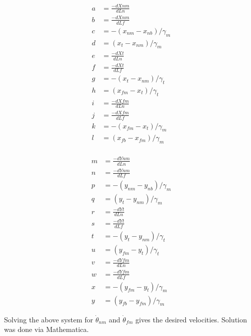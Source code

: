 \documentclass[
11pt, %
english, %
singlespacing, %
headsepline, %
chapterinoneline, %
]{MastersDoctoralThesis} %
\begin{document}
\begin{center}
  \begin{minipage}{0.3\textwidth}
    \begin{align*}
      a &= \frac{-dXnm}{dLn}\\
       b &= \frac{-dXnm}{dLf}\\
       c &= -(x_{nm} - x_{nb}) / \gamma_m\\
       d &= (x_t - x_{nm}) / \gamma_m\\
       e &= \frac{-dXt}{dLn}\\
       f &= \frac{-dXt}{dLf}\\
       g &= -(x_t - x_{nm}) / \gamma_t\\
       h &= (x_{fm} - x_t) / \gamma_t\\
       i &= \frac{-dXfm}{dLn}\\
       j &= \frac{-dXfm}{dLf}\\
       k &= -(x_{fm} - x_t) / \gamma_m\\
       l &= (x_{fb} - x_{fm}) / \gamma_m\\
    \end{align*}
  \end{minipage}
  \begin{minipage}{0.3\textwidth}
    \begin{align*}
       m &= \frac{-dYnm}{dLn}\\
       n &= \frac{-dYnm}{dLf}\\
       p &= -(y_{nm} - y_{nb}) / \gamma_m\\
       q &= (y_t - y_{nm}) / \gamma_m\\
       r &= \frac{-dYt}{dLn}\\
       s &= \frac{-dYt}{dLf}\\
       t &= -(y_t - y_{nm}) / \gamma_t\\
       u &= (y_{fm} - y_t) / \gamma_t\\
       v &= \frac{-dYfm}{dLn}\\
       w &= \frac{-dYfm}{dLf}\\
       x &= -(y_{fm} - y_t) / \gamma_m\\
       y &= (y_{fb} - y_{fm}) / \gamma_m
    \end{align*}
  \end{minipage}
\end{center}

Solving the above system for $\dot{\theta}_{nm}$ and $\dot{\theta}_{fm}$ gives the desired velocities. Solution was done via Mathematica.
\end{document}
